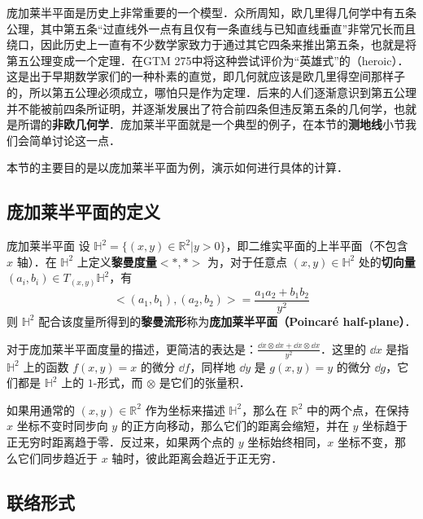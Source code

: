 
庞加莱半平面是历史上非常重要的一个模型．众所周知，欧几里得几何学中有五条公理，其中第五条“过直线外一点有且仅有一条直线与已知直线垂直”非常冗长而且绕口，因此历史上一直有不少数学家致力于通过其它四条来推出第五条，也就是将第五公理变成一个定理．在GTM 275\cite{GTM275}中将这种尝试评价为“英雄式”的（heroic）．这是出于早期数学家们的一种朴素的直觉，即几何就应该是欧几里得空间那样子的，所以第五公理必须成立，哪怕只是作为定理．后来的人们逐渐意识到第五公理并不能被前四条所证明，并逐渐发展出了符合前四条但违反第五条的几何学，也就是所谓的\textbf{非欧几何学}．庞加莱半平面就是一个典型的例子，在本节的\textbf{测地线}小节我们会简单讨论这一点．

本节的主要目的是以庞加莱半平面为例，演示如何进行具体的计算．

\subsection{庞加莱半平面的定义}

\begin{definition}{庞加莱半平面}
设 $\mathbb{H}^2=\{(x, y)\in \mathbb{R}^2|y>0\}$，即二维实平面的上半平面（不包含 $x$ 轴）．在 $\mathbb{H}^2$ 上定义\textbf{黎曼度量}$<*,*>$ 为，对于任意点 $(x, y)\in \mathbb{H}^2$ 处的\textbf{切向量}$(a_i, b_i)\in T_{(x, y)}\mathbb{H}^2$，有
\begin{equation}
<(a_1, b_1), (a_2, b_2)>=\frac{a_1a_2+b_1b_2}{y^2}
\end{equation}
则 $\mathbb{H}^2$ 配合该度量所得到的\textbf{黎曼流形}称为\textbf{庞加莱半平面（Poincaré half-plane）}．
\end{definition}

对于庞加莱半平面度量的描述，更简洁的表达是：$\frac{\dd x\otimes \dd x+ \dd x\otimes\dd x}{y^2}$．这里的 $\dd x$ 是指 $\mathbb{H}^2$ 上的函数 $f(x, y)=x$ 的微分 $\dd f$，同样地 $\dd y$ 是 $g(x, y)=y$ 的微分 $\dd g$，它们都是 $\mathbb{H}^2$ 上的 $1$-形式，而 $\otimes$ 是它们的张量积．

如果用通常的 $(x, y)\in \mathbb{R}^2$ 作为坐标来描述 $\mathbb{H}^2$，那么在 $\mathbb{R}^2$ 中的两个点，在保持 $x$ 坐标不变时同步向 $y$ 的正方向移动，那么它们的距离会缩短，并在 $y$ 坐标趋于正无穷时距离趋于零．反过来，如果两个点的 $y$ 坐标始终相同，$x$ 坐标不变，那么它们同步趋近于 $x$ 轴时，彼此距离会趋近于正无穷．

\subsection{联络形式}


